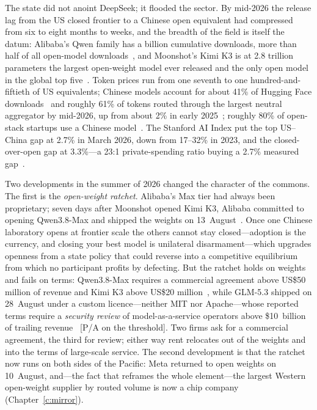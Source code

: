 The state did not anoint DeepSeek; it flooded the sector. By mid-2026 the release lag from the US closed frontier to a Chinese open equivalent had compressed from six to eight months to weeks, and the breadth of the field is itself the datum: Alibaba's Qwen family has a billion cumulative downloads, more than half of all open-model downloads~\cite{qwen-downloads}, and Moonshot's Kimi K3 is at 2.8 trillion parameters the largest open-weight model ever released and the only open model in the global top five~\cite{kimi-k3}. Token prices run from one seventh to one hundred-and-fiftieth of US equivalents; Chinese models account for about 41\% of Hugging Face downloads~\cite{hf-spring-2026} and roughly 61\% of tokens routed through the largest neutral aggregator by mid-2026, up from about 2\% in early 2025~\cite{openrouter-2026}; roughly 80\% of open-stack startups use a Chinese model~\cite{casado}. The Stanford AI Index put the top US--China gap at 2.7\% in March 2026, down from 17--32\% in 2023, and the closed-over-open gap at 3.3\%---a 23:1 private-spending ratio buying a 2.7\% measured gap~\cite{stanford-aiindex-2026}.

Two developments in the summer of 2026 changed the character of the commons. The first is the \emph{open-weight ratchet}. Alibaba's Max tier had always been proprietary; seven days after Moonshot opened Kimi K3, Alibaba committed to opening Qwen3.8-Max and shipped the weights on 13~August~\cite{qwen38-weights}. Once one Chinese laboratory opens at frontier scale the others cannot stay closed---adoption is the currency, and closing your best model is unilateral disarmament---which upgrades openness from a state policy that could reverse into a competitive equilibrium from which no participant profits by defecting. But the ratchet holds on weights and fails on terms: Qwen3.8-Max requires a commercial agreement above US\$50 million of revenue and Kimi K3 above US\$20 million~\cite{kimiLicense}, while GLM-5.3 shipped on 28~August under a custom licence---neither MIT nor Apache---whose reported terms require a \emph{security review} of model-as-a-service operators above \$10~billion of trailing revenue~\cite{glm53} [P/A on the threshold]. Two firms ask for a commercial agreement, the third for review; either way rent relocates out of the weights and into the terms of large-scale service. The second development is that the ratchet now runs on both sides of the Pacific: Meta returned to open weights on 10~August, and---the fact that reframes the whole element---the largest Western open-weight supplier by routed volume is now a chip company (Chapter~\ref{c:mirror}).

